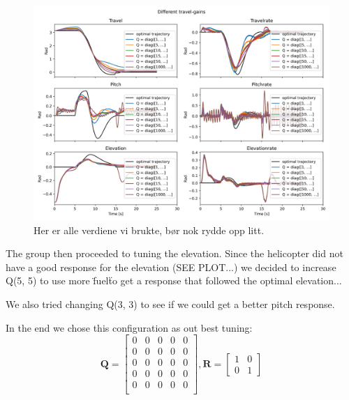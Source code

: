 \documentclass[../main.tex]{subfiles}
\begin{document}
\begin{figure}[h]
	\centering
	\includegraphics[width=\linewidth]{figures/LAB4_travel_gains.png}
	\caption{Her er alle verdiene vi brukte, bør nok rydde opp litt.}
\end{figure}

The group then proceeded to tuning the elevation. Since the helicopter did not have a good response for the elevation (SEE PLOT...) we decided to increase Q(5, 5) to use more \"fuel\" to get a response that followed the optimal elevation...


We also tried changing Q(3, 3) to see if we could get a better pitch response.

In the end we chose this configuration as out best tuning: 
\begin{equation}\label{key}
	\bm Q = \begin{bmatrix}
		0 & 0 & 0 & 0 & 0 \\
		0 & 0 & 0 & 0 & 0 \\
		0 & 0 & 0 & 0 & 0 \\
		0 & 0 & 0 & 0 & 0 \\
		0 & 0 & 0 & 0 & 0 \\
	\end{bmatrix}, 
	\bm R = \begin{bmatrix}
		1 & 0 \\ 
		0 & 1
	\end{bmatrix}
\end{equation}
\end{document}

